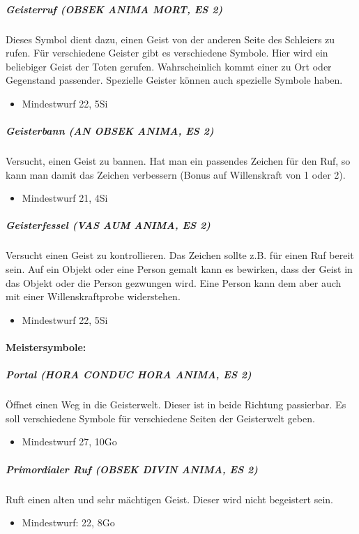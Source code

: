\documentclass{article}
\begin{document}
\subparagraph{Geisterruf (OBSEK ANIMA MORT, ES 2)}

Dieses Symbol dient dazu, einen Geist von der anderen Seite des Schleiers zu rufen. Für verschiedene Geister gibt es verschiedene Symbole. Hier wird ein beliebiger Geist der Toten gerufen. Wahrscheinlich kommt einer zu Ort oder Gegenstand passender. Spezielle Geister können auch spezielle Symbole haben.
\begin{itemize}
\item Mindestwurf 22, 5Si
\end{itemize}

\subparagraph{Geisterbann (AN OBSEK ANIMA, ES 2)}

Versucht, einen Geist zu bannen. Hat man ein passendes Zeichen für den Ruf, so kann man damit das Zeichen verbessern (Bonus auf Willenskraft von 1 oder 2).
\begin{itemize}
\item Mindestwurf 21, 4Si
\end{itemize}

\subparagraph{Geisterfessel (VAS AUM ANIMA, ES 2)}

Versucht einen Geist zu kontrollieren. Das Zeichen sollte z.B. für einen Ruf bereit sein. Auf ein Objekt oder eine Person gemalt kann es bewirken, dass der Geist in das Objekt oder die Person gezwungen wird. Eine Person kann dem aber auch mit einer Willenskraftprobe widerstehen.
\begin{itemize}
\item Mindestwurf 22, 5Si
\end{itemize}

\paragraph{Meistersymbole:}

\subparagraph{Portal (HORA CONDUC HORA ANIMA, ES 2)}

Öffnet einen Weg in die Geisterwelt. Dieser ist in beide Richtung passierbar. Es soll verschiedene Symbole für verschiedene Seiten der Geisterwelt geben.
\begin{itemize}
\item Mindestwurf 27, 10Go 
\end{itemize}

\subparagraph{Primordialer Ruf (OBSEK DIVIN ANIMA, ES 2)}
Ruft einen alten und sehr mächtigen Geist. Dieser wird nicht begeistert sein.
\begin{itemize}
\item Mindestwurf: 22, 8Go
\end{itemize}
\end{document}
